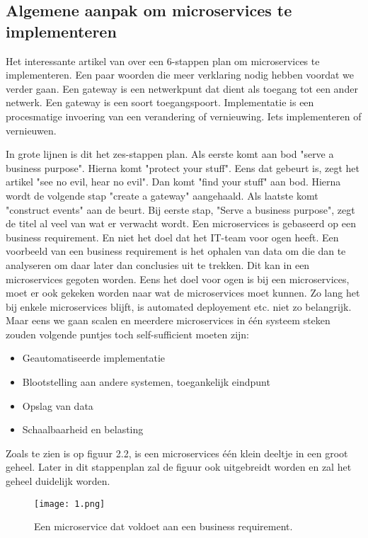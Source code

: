 \subsection{Algemene aanpak om microservices te implementeren}
Het interessante artikel van \textcite{Benetis2016} over een 6-stappen plan om microservices te implementeren. Een paar woorden die meer verklaring nodig hebben voordat we verder gaan. Een gateway is een netwerkpunt dat dient als toegang tot een ander netwerk. Een gateway is een soort toegangspoort. Implementatie is een procesmatige invoering van een verandering of vernieuwing. Iets implementeren of vernieuwen. 

In grote lijnen is dit het zes-stappen plan. Als eerste komt aan bod "serve a business purpose". Hierna komt "protect your stuff". Eens dat gebeurt is, zegt het artikel "see no evil, hear no evil". Dan komt "find your stuff" aan bod. Hierna wordt de volgende stap "create a gateway" aangehaald. Als laatste komt "construct events" aan de beurt. 
Bij eerste stap, "Serve a business purpose", zegt de titel al veel van wat er verwacht wordt. Een microservices is gebaseerd op een business requirement. En niet het doel dat het IT-team voor ogen heeft. Een voorbeeld van een business requirement is het ophalen van data om die dan te analyseren om daar later dan conclusies uit te trekken. Dit kan in een microservices gegoten worden. Eens het doel voor ogen is bij een microservices, moet er ook gekeken worden naar wat de microservices moet kunnen. Zo lang het bij enkele microservices blijft, is automated deployement etc. niet zo belangrijk. Maar eens we gaan scalen en meerdere microservices in één systeem steken zouden volgende puntjes toch self-sufficient moeten zijn:
\begin{itemize}
	\item Geautomatiseerde implementatie
	\item Blootstelling aan andere systemen, toegankelijk eindpunt
	\item Opslag van data
	\item Schaalbaarheid en belasting
\end{itemize}
Zoals te zien is op figuur 2.2, is een microservices één klein deeltje in een groot geheel. Later in dit stappenplan zal de figuur ook uitgebreidt worden en zal het geheel duidelijk worden. 
\begin{figure}[h]
	\texttt{[image: 1.png]}
	\caption{Een microservice dat voldoet aan een business requirement. \textcite{Benetis2016}}
	\centering
\end{figure}

